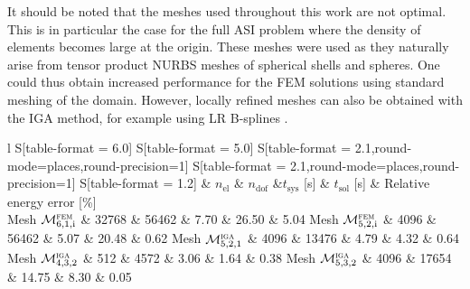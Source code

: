 It should be noted that the meshes used throughout this work are not optimal. This is in particular the case for the full ASI problem where the density of elements becomes large at the origin. These meshes were used as they naturally arise from tensor product NURBS meshes of spherical shells and spheres. One could thus obtain increased performance for the FEM solutions using standard meshing of the domain. However, locally refined meshes can also be obtained with the IGA method, for example using LR B-splines \cite{Johannessen2014iau}.

\begin{table}
	\centering
	\caption{\textbf{Ihlenburg benchmark}: Data for some simulations on the rigid scattering problem with $k=\SI{1}{m^{-1}}$. The errors are given in the energy norm (). For each simulation, the mesh number, the polynomial order, $\check{p}$, the number of mesh elements $n_{\mathrm{el}}$ (not including the infinite elements) and the number of degrees of freedom $n_{\mathrm{dof}}$, is reported. The elapsed times for building the system $t_{\mathrm{sys}}$ and for solving the system $t_{\mathrm{sol}}$ (using LU-factorization) are also included (times in seconds). Finally, the relative error in the energy norm is given in percentage.}
	\label{Tab2:dataRigidScattering}
	\begin{subtable}[t]{\linewidth}
		\caption{Sound-hard boundary conditions (SHBC).}
		\label{Tab2:dataRigidScatteringSHBC}
		\centering
		\bgroup
		\def\arraystretch{1.1}%
		\begin{tabular}{l S[table-format = 6.0] S[table-format = 5.0] S[table-format = 2.1,round-mode=places,round-precision=1] S[table-format = 2.1,round-mode=places,round-precision=1] S[table-format = 1.2]}
			\hline
			 		   & {$n_{\mathrm{el}}$} & {$n_{\mathrm{dof}}$} &{$t_{\mathrm{sys}}$ [s]}	& {$t_{\mathrm{sol}}$ [s]} 		& {Relative energy error [\%]} \\
			\hline
Mesh ${\cal M}_{6,1,\mathrm{i}}^{\textsc{fem}}$		& 32768	& 56462	& 7.70	& 26.50	& 5.04	\cr
Mesh ${\cal M}_{5,2,\mathrm{i}}^{\textsc{fem}}$		& 4096	& 56462	& 5.07	& 20.48	& 0.62	\cr
Mesh ${\cal M}_{5,2,1}^{\textsc{iga}}$				& 4096	& 13476	& 4.79	& 4.32	& 0.64	\cr
Mesh ${\cal M}_{4,3,2}^{\textsc{iga}}$				& 512	& 4572	& 3.06	& 1.64	& 0.38	\cr
Mesh ${\cal M}_{5,3,2}^{\textsc{iga}}$				& 4096	& 17654	& 14.75	& 8.30	& 0.05	\cr
			\hline
		\end{tabular}
		\egroup
	\end{subtable}
	\par\bigskip

\end{table}
